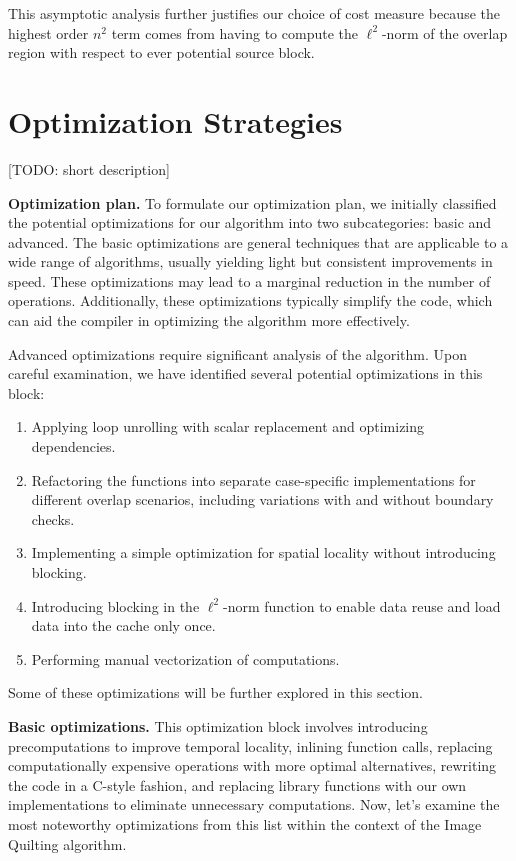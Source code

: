 \documentclass[letterpaper]{article}
\newcommand{\mypar}[1]{{\bf #1.}}
\begin{document}
This asymptotic analysis further justifies our choice of cost measure because the highest order $n^2$ term comes from having to compute the $\ell ^2$-norm of the overlap region with respect to ever potential source block.

\section{Optimization Strategies}\label{sec:yourmethod}

[TODO: short description]


\mypar{Optimization plan} 
To formulate our optimization plan, we initially classified the potential optimizations for our algorithm into two subcategories: basic and advanced. The basic optimizations are general techniques that are applicable to a wide range of algorithms, usually yielding light but consistent improvements in speed. These optimizations may lead to a marginal reduction in the number of operations. Additionally, these optimizations typically simplify the code, which can aid the compiler in optimizing the algorithm more effectively.

Advanced optimizations require significant analysis of the algorithm. Upon careful examination, we have identified several potential optimizations in this block:

\begin{enumerate}
\item Applying loop unrolling with scalar replacement and optimizing dependencies.
\item Refactoring the functions into separate case-specific implementations for different overlap scenarios, including variations with and without boundary checks.
\item Implementing a simple optimization for spatial locality without introducing blocking.
\item Introducing blocking in the $\ell ^2$-norm function to enable data reuse and load data into the cache only once.
\item Performing manual vectorization of computations.
\end{enumerate}

Some of these optimizations will be further explored in this section.

\mypar{Basic optimizations}
This optimization block involves introducing precomputations to improve temporal locality, inlining function calls, replacing computationally expensive operations with more optimal alternatives, rewriting the code in a C-style fashion, and replacing library functions with our own implementations to eliminate unnecessary computations. Now, let's examine the most noteworthy optimizations from this list within the context of the Image Quilting algorithm.
\end{document}

